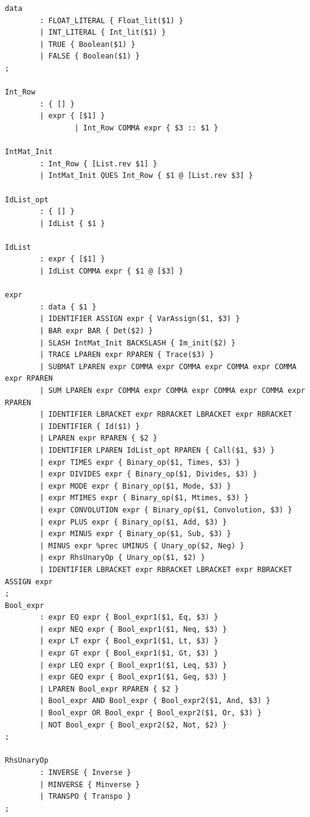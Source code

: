 \documentclass[12pt]{article} %
\begin{document}
\begin{verbatim}
data
        : FLOAT_LITERAL { Float_lit($1) }
        | INT_LITERAL { Int_lit($1) }
        | TRUE { Boolean($1) }
        | FALSE { Boolean($1) }
;

Int_Row
        : { [] }
        | expr { [$1] }
                | Int_Row COMMA expr { $3 :: $1 }

IntMat_Init
        : Int_Row { [List.rev $1] }
        | IntMat_Init QUES Int_Row { $1 @ [List.rev $3] }

IdList_opt
        : { [] }
        | IdList { $1 }

IdList
        : expr { [$1] }
        | IdList COMMA expr { $1 @ [$3] }

expr
        : data { $1 }
        | IDENTIFIER ASSIGN expr { VarAssign($1, $3) }
        | BAR expr BAR { Det($2) }
        | SLASH IntMat_Init BACKSLASH { Im_init($2) }
        | TRACE LPAREN expr RPAREN { Trace($3) }
        | SUBMAT LPAREN expr COMMA expr COMMA expr COMMA expr COMMA expr RPAREN 
        | SUM LPAREN expr COMMA expr COMMA expr COMMA expr COMMA expr RPAREN 
        | IDENTIFIER LBRACKET expr RBRACKET LBRACKET expr RBRACKET 
        | IDENTIFIER { Id($1) }
        | LPAREN expr RPAREN { $2 }
        | IDENTIFIER LPAREN IdList_opt RPAREN { Call($1, $3) }
        | expr TIMES expr { Binary_op($1, Times, $3) }
        | expr DIVIDES expr { Binary_op($1, Divides, $3) }
        | expr MODE expr { Binary_op($1, Mode, $3) }
        | expr MTIMES expr { Binary_op($1, Mtimes, $3) }
        | expr CONVOLUTION expr { Binary_op($1, Convolution, $3) }
        | expr PLUS expr { Binary_op($1, Add, $3) }
        | expr MINUS expr { Binary_op($1, Sub, $3) }
        | MINUS expr %prec UMINUS { Unary_op($2, Neg) }
        | expr RhsUnaryOp { Unary_op($1, $2) }
        | IDENTIFIER LBRACKET expr RBRACKET LBRACKET expr RBRACKET ASSIGN expr 
;
Bool_expr
        : expr EQ expr { Bool_expr1($1, Eq, $3) }
        | expr NEQ expr { Bool_expr1($1, Neq, $3) }
        | expr LT expr { Bool_expr1($1, Lt, $3) }
        | expr GT expr { Bool_expr1($1, Gt, $3) }
        | expr LEQ expr { Bool_expr1($1, Leq, $3) }
        | expr GEQ expr { Bool_expr1($1, Geq, $3) }
        | LPAREN Bool_expr RPAREN { $2 }
        | Bool_expr AND Bool_expr { Bool_expr2($1, And, $3) }
        | Bool_expr OR Bool_expr { Bool_expr2($1, Or, $3) }
        | NOT Bool_expr { Bool_expr2($2, Not, $2) }
;

RhsUnaryOp
        : INVERSE { Inverse }
        | MINVERSE { Minverse }
        | TRANSPO { Transpo }
;

                                                    
\end{verbatim}
\end{document}
